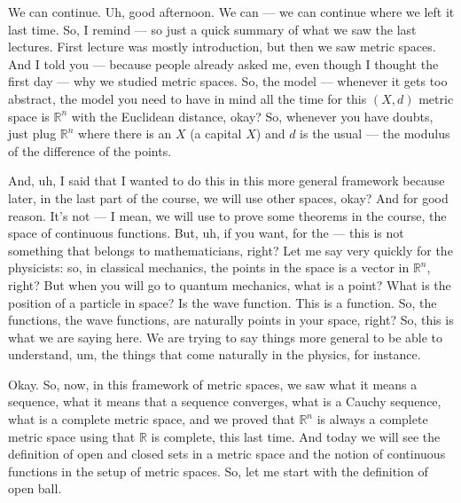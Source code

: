 \begin{spoken-clean}[00:00:00 - 00:01:50]
We can continue. Uh, good afternoon. We can --- we can continue where we left it last time. So, I remind --- so just a quick summary of what we saw the last lectures. First lecture was mostly introduction, but then we saw metric spaces. And I told you --- because people already asked me, even though I thought the first day --- why we studied metric spaces. So, the model --- whenever it gets too abstract, the model you need to have in mind all the time for this $(X, d)$ metric space is $\mathbb{R}^n$ with the Euclidean distance, okay? So, whenever you have doubts, just plug $\mathbb{R}^n$ where there is an $X$ (a capital $X$) and $d$ is the usual --- the modulus of the difference of the points. 

And, uh, I said that I wanted to do this in this more general framework because later, in the last part of the course, we will use other spaces, okay? And for good reason. It's not --- I mean, we will use to prove some theorems in the course, the space of continuous functions. But, uh, if you want, for the --- this is not something that belongs to mathematicians, right? Let me say very quickly for the physicists: so, in classical mechanics, the points in the space is a vector in $\mathbb{R}^n$, right? But when you will go to quantum mechanics, what is a point? What is the position of a particle in space? Is the wave function. This is a function. So, the functions, the wave functions, are naturally points in your space, right? So, this is what we are saying here. We are trying to say things more general to be able to understand, um, the things that come naturally in the physics, for instance.
\end{spoken-clean}

\begin{spoken-clean}[00:01:50 - 00:02:22]
Okay. So, now, in this framework of metric spaces, we saw what it means a sequence, what it means that a sequence converges, what is a Cauchy sequence, what is a complete metric space, and we proved that $\mathbb{R}^n$ is always a complete metric space using that $\mathbb{R}$ is complete, this last time. And today we will see the definition of open and closed sets in a metric space and the notion of continuous functions in the setup of metric spaces. So, let me start with the definition of open ball.
\end{spoken-clean}

